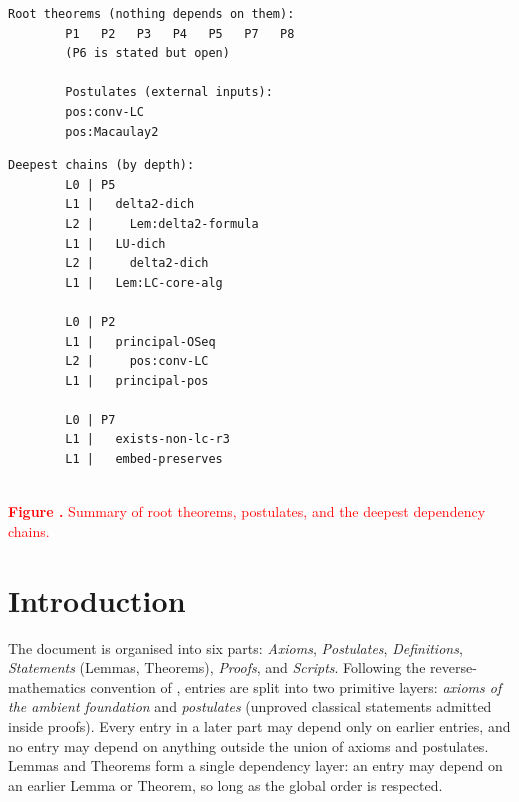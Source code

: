 \documentclass[11pt,reqno]{amsart}
\begin{document}
\begin{center}
\begin{minipage}[c]{0.50\linewidth}
		\vspace{0pt}
		\begin{Verbatim}[frame=single,framerule=0.7pt,
		rulecolor=\color{blue!60!black},framesep=8pt,
		fontsize=\fontsize{8}{9}\selectfont,
		formatcom=\color{red}\bfseries,
		xleftmargin=6pt,xrightmargin=6pt]
		Root theorems (nothing depends on them):
		P1   P2   P3   P4   P5   P7   P8
		(P6 is stated but open)

		Postulates (external inputs):
		pos:conv-LC
		pos:Macaulay2
		\end{Verbatim}
	\end{minipage}\hfill 
\begin{minipage}[c]{0.43\linewidth}
		\vspace{0pt}
		\begin{Verbatim}[frame=single,framerule=0.7pt,
		rulecolor=\color{blue!60!black},framesep=8pt,
		fontsize=\fontsize{8}{9}\selectfont,
		formatcom=\color{red}\bfseries,
		xleftmargin=6pt,xrightmargin=6pt]
		Deepest chains (by depth):
		L0 | P5
		L1 |   delta2-dich
		L2 |     Lem:delta2-formula
		L1 |   LU-dich
		L2 |     delta2-dich
		L1 |   Lem:LC-core-alg

		L0 | P2
		L1 |   principal-OSeq
		L2 |     pos:conv-LC
		L1 |   principal-pos

		L0 | P7
		L1 |   exists-non-lc-r3
		L1 |   embed-preserves
		\end{Verbatim}
	\end{minipage}

\medskip \noindent \text{ \ } \\[0pt]
{\small {}%
\textcolor{red}{\textbf{Figure \thefigure.}\enspace
			Summary of root theorems, postulates, and the deepest dependency
			chains.}} \label{fig:summary}
\end{center}

\newpage \pagestyle{plain}  


\section{Introduction}

\noindent The document is organised into six parts: \emph{Axioms}, \emph{%
Postulates}, \emph{Definitions}, \emph{Statements} (Lemmas, Theorems), \emph{%
Proofs}, and \emph{Scripts}. Following the reverse-mathematics convention of 
\cite{simpson2009}, entries are split into two primitive layers: \emph{%
axioms of the ambient foundation} and \emph{postulates} (unproved classical
statements admitted inside proofs). Every entry in a later part may depend
only on earlier entries, and no entry may depend on anything outside the
union of axioms and postulates. Lemmas and Theorems form a single dependency
layer: an entry may depend on an earlier Lemma or Theorem, so long as the
global order is respected.
\end{document}
